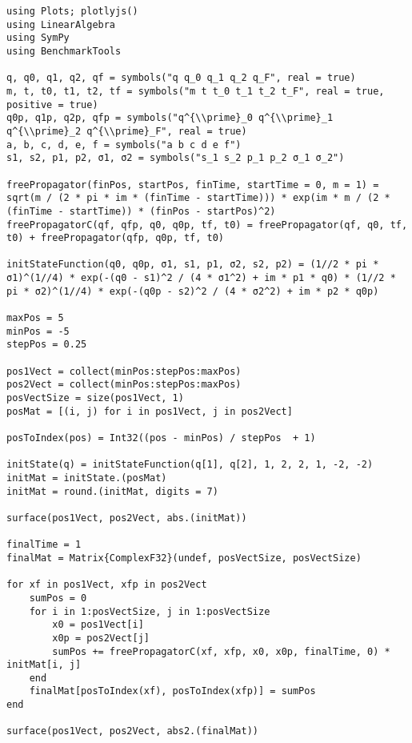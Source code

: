 \begin{verbatim}
using Plots; plotlyjs()
using LinearAlgebra
using SymPy
using BenchmarkTools

q, q0, q1, q2, qf = symbols("q q_0 q_1 q_2 q_F", real = true)
m, t, t0, t1, t2, tf = symbols("m t t_0 t_1 t_2 t_F", real = true, positive = true)
q0p, q1p, q2p, qfp = symbols("q^{\\prime}_0 q^{\\prime}_1 q^{\\prime}_2 q^{\\prime}_F", real = true)
a, b, c, d, e, f = symbols("a b c d e f")
s1, s2, p1, p2, σ1, σ2 = symbols("s_1 s_2 p_1 p_2 σ_1 σ_2")

freePropagator(finPos, startPos, finTime, startTime = 0, m = 1) = sqrt(m / (2 * pi * im * (finTime - startTime))) * exp(im * m / (2 * (finTime - startTime)) * (finPos - startPos)^2)  
freePropagatorC(qf, qfp, q0, q0p, tf, t0) = freePropagator(qf, q0, tf, t0) + freePropagator(qfp, q0p, tf, t0)

initStateFunction(q0, q0p, σ1, s1, p1, σ2, s2, p2) = (1//2 * pi * σ1)^(1//4) * exp(-(q0 - s1)^2 / (4 * σ1^2) + im * p1 * q0) * (1//2 * pi * σ2)^(1//4) * exp(-(q0p - s2)^2 / (4 * σ2^2) + im * p2 * q0p)

maxPos = 5
minPos = -5
stepPos = 0.25

pos1Vect = collect(minPos:stepPos:maxPos)
pos2Vect = collect(minPos:stepPos:maxPos)
posVectSize = size(pos1Vect, 1)
posMat = [(i, j) for i in pos1Vect, j in pos2Vect]

posToIndex(pos) = Int32((pos - minPos) / stepPos  + 1)

initState(q) = initStateFunction(q[1], q[2], 1, 2, 2, 1, -2, -2)
initMat = initState.(posMat)
initMat = round.(initMat, digits = 7)

surface(pos1Vect, pos2Vect, abs.(initMat))

finalTime = 1
finalMat = Matrix{ComplexF32}(undef, posVectSize, posVectSize)

for xf in pos1Vect, xfp in pos2Vect
    sumPos = 0
    for i in 1:posVectSize, j in 1:posVectSize
        x0 = pos1Vect[i]
        x0p = pos2Vect[j]
        sumPos += freePropagatorC(xf, xfp, x0, x0p, finalTime, 0) * initMat[i, j]
    end
    finalMat[posToIndex(xf), posToIndex(xfp)] = sumPos
end

surface(pos1Vect, pos2Vect, abs2.(finalMat))
\end{verbatim}